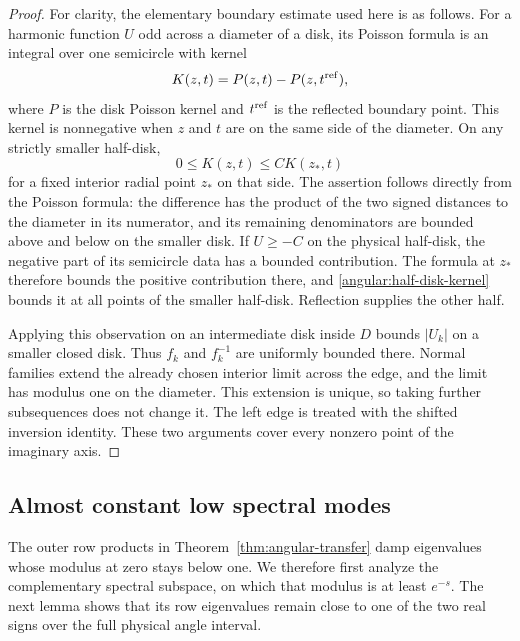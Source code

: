 \begin{proof}
For clarity, the elementary boundary estimate used here is as follows.
For a harmonic function $U$ odd across a diameter of a disk, its
Poisson formula is an integral over one semicircle with kernel
\[
 K(z,t)=P(z,t)-P(z,t^{\rm ref}),
\]
where $P$ is the disk Poisson kernel and $t^{\rm ref}$ is the reflected
boundary point.  This kernel is nonnegative when $z$ and $t$ are on
the same side of the diameter.  On any strictly smaller half-disk,
\begin{equation}\label{angular:half-disk-kernel}
 0\le K(z,t)\le C K(z_*,t)
\end{equation}
for a fixed interior radial point $z_*$ on that side.  The assertion
follows directly from the Poisson formula: the difference has the
product of the two signed distances to the diameter in its numerator,
and its remaining denominators are bounded above and below on the
smaller disk.  If $U\ge-C$ on the physical half-disk, the negative
part of its semicircle data has a bounded contribution.  The formula
at $z_*$ therefore bounds the positive contribution there, and
\eqref{angular:half-disk-kernel} bounds it at all points of the smaller
half-disk.  Reflection supplies the other half.

Applying this observation on an intermediate disk inside $D$ bounds
$|U_k|$ on a smaller closed disk.  Thus $f_k$ and $f_k^{-1}$ are
uniformly bounded there.  Normal families extend the already chosen
interior limit across the edge, and the limit has modulus one on the
diameter.  This extension is unique, so taking further subsequences
does not change it.  The left edge is treated with the shifted
inversion identity.  These two arguments cover every nonzero point
of the imaginary axis.
\end{proof}

\subsection{Almost constant low spectral modes}

The outer row products in Theorem~\ref{thm:angular-transfer} damp
eigenvalues whose modulus at zero stays below one.  We therefore first
analyze the complementary spectral subspace, on which that modulus is
at least $e^{-s}$.  The next lemma shows that its row eigenvalues remain
close to one of the two real signs over the full physical angle interval.

